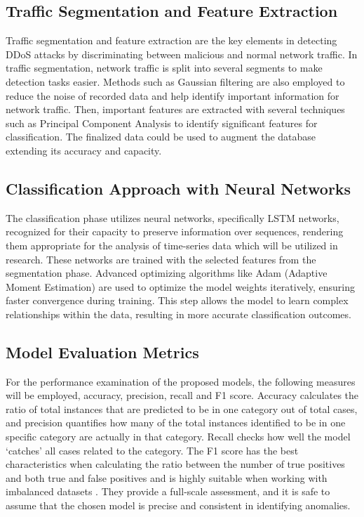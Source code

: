 \documentclass[a4paper, 12pt]{article}
\begin{document}
\subsection{ Traffic Segmentation and Feature Extraction }

Traffic segmentation and feature extraction are the key elements in detecting DDoS attacks by discriminating between malicious and normal network traffic. In traffic segmentation, network traffic is split into several segments to make detection tasks easier. Methods such as Gaussian filtering are also employed to reduce the noise of recorded data and help identify important information for network traffic.  Then, important features are extracted with several techniques such as Principal Component Analysis to identify significant features for classification. The finalized data could be used to augment the database extending its accuracy and capacity.

\subsection{ Classification Approach with Neural Networks }

The classification phase utilizes neural networks, specifically LSTM networks, recognized for their capacity to preserve information over sequences, rendering them appropriate for the analysis of time-series data which will be utilized in research\cite {2}. These networks are trained with the selected features from the segmentation phase. Advanced optimizing algorithms like Adam (Adaptive Moment Estimation) are used to optimize the model weights iteratively, ensuring faster convergence during training.  This step allows the model to learn complex relationships within the data, resulting in more accurate classification outcomes.

\subsection{ Model Evaluation Metrics }

For the performance examination of the proposed models, the following measures will be employed, accuracy, precision, recall and F1 score. Accuracy calculates the ratio of total instances that are predicted to be in one category out of total cases, and precision quantifies how many of the total instances identified to be in one specific category are actually in that category. Recall checks how well the model ‘catches’ all cases related to the category. The F1 score has the best characteristics when calculating the ratio between the number of true positives and both true and false positives and is highly suitable when working with imbalanced datasets . They provide a full-scale assessment, and it is safe to assume that the chosen model is precise and consistent in identifying anomalies.
\end{document}
